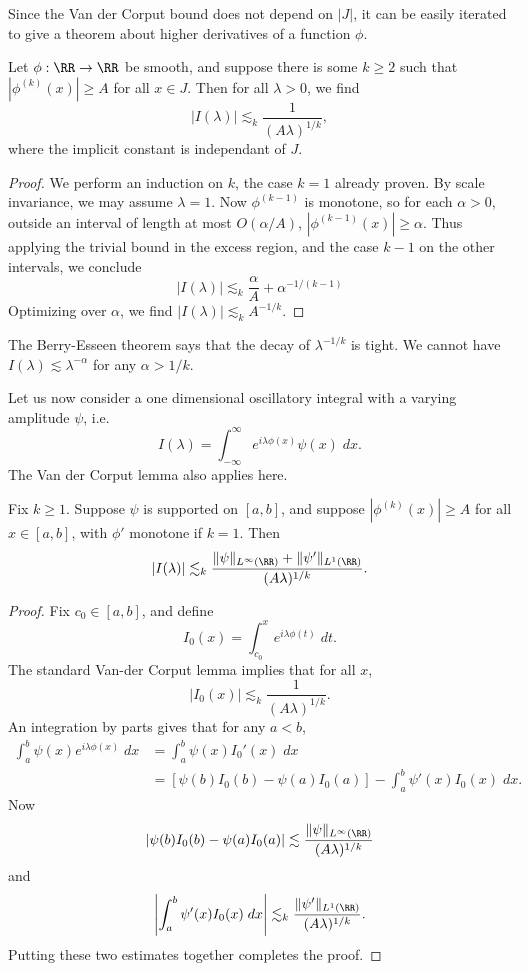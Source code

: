 Since the Van der Corput bound does not depend on $|J|$, it can be easily iterated to give a theorem about higher derivatives of a function $\phi$.

\begin{lemma}
  Let $\phi: \RR \to \RR$ be smooth, and suppose there is some $k \geq 2$ such that $|\phi^{(k)}(x)| \geq A$ for all $x \in J$. Then for all $\lambda > 0$, we find
  \[ |I(\lambda)| \lesssim_k \frac{1}{(A \lambda)^{1/k}}, \]
  where the implicit constant is independant of $J$.
\end{lemma}
\begin{proof}
  We perform an induction on $k$, the case $k = 1$ already proven. By scale invariance, we may assume $\lambda = 1$. Now $\phi^{(k-1)}$ is monotone, so for each $\alpha > 0$, outside an interval of length at most $O(\alpha/A)$, $|\phi^{(k-1)}(x)| \geq \alpha$. Thus applying the trivial bound in the excess region, and the case $k - 1$ on the other intervals, we conclude
  \[ |I(\lambda)| \lesssim_k \frac{\alpha}{A} + \alpha^{-1/(k-1)} \]
  Optimizing over $\alpha$, we find $|I(\lambda)| \lesssim_k A^{-1/k}$.
\end{proof}

\begin{remark}
  The Berry-Esseen theorem says that the decay of $\lambda^{-1/k}$ is tight. We cannot have $I(\lambda) \lesssim \lambda^{-\alpha}$ for any $\alpha > 1/k$.
\end{remark}

Let us now consider a one dimensional oscillatory integral with a varying amplitude $\psi$, i.e.
%
\[ I(\lambda) = \int_{-\infty}^\infty e^{i \lambda \phi(x)} \psi(x)\; dx. \]
%
The Van der Corput lemma also applies here.

\begin{lemma}
  Fix $k \geq 1$. Suppose $\psi$ is supported on $[a,b]$, and suppose $|\phi^{(k)}(x)| \geq A$ for all $x \in [a,b]$, with $\phi'$ monotone if $k = 1$. Then
  \[ |I(\lambda)| \lesssim_k \frac{\| \psi \|_{L^\infty(\RR)} + \| \psi' \|_{L^1(\RR)}}{(A \lambda)^{1/k}}. \]
\end{lemma}
\begin{proof}
  Fix $c_0 \in [a,b]$, and define
  \[ I_0(x) = \int_{c_0}^x e^{i \lambda \phi(t)}\; dt. \]
  The standard Van-der Corput lemma implies that for all $x$,
  \[ |I_0(x)| \lesssim_k \frac{1}{(A \lambda)^{1/k}}. \]
  An integration by parts gives that for any $a < b$,
  \begin{align*}
    \int_a^b \psi(x) e^{i \lambda \phi(x)}\; dx &= \int_a^b \psi(x) I_0'(x)\; dx\\
    &= [\psi(b) I_0(b) - \psi(a) I_0(a)] - \int_a^b \psi'(x) I_0(x)\; dx.
  \end{align*}
  Now
  \[ |\psi(b) I_0(b) - \psi(a) I_0(a)| \lesssim \frac{\| \psi \|_{L^\infty(\RR)}}{(A \lambda)^{1/k}} \]
  and
  \[ \left| \int_a^b \psi'(x) I_0(x)\; dx \right| \lesssim_k \frac{\| \psi' \|_{L^1(\RR)}}{(A \lambda)^{1/k}}. \]
  Putting these two estimates together completes the proof.
\end{proof}

